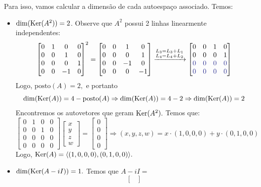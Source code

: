 \documentclass[11pt,a4paper]{article}
\begin{document}
{Para isso, vamos calcular a dimensão de cada autoespaço associado. Temos:
\begin{itemize}
\item $\dim(\operatorname{Ker}(A^2)) =2$. Observe que $A^2$ possui 2 linhas linearmente independentes:
\[ \begin{bmatrix}
0 & 1 & 0& 0\\
0 &0 &1 & 0 \\
0 &0 &0& 1 \\
0 & 0 & -1&0
\end{bmatrix}^2 = \begin{bmatrix}
0 & 0 & 1& 0\\
0 &0 &0 & 1 \\
0 &0 &-1& 0 \\
0 & 0 & 0&-1
\end{bmatrix}  \xrightarrow[]{\substack{L_3 = L_3 +L_1 \\L_4 = L_4 +L_2}}  \begin{bmatrix}
0 & 0 & 1& 0\\
0 &0 &0 & 1 \\
\textcolor{Blue}{0} & \textcolor{Blue}{0} & \textcolor{Blue}{0}&\textcolor{Blue}{0}\\
\textcolor{Blue}{0} & \textcolor{Blue}{0} & \textcolor{Blue}{0}&\textcolor{Blue}{0}
\end{bmatrix} 
\]
Logo, $\mbox{posto}(A) = 2,$ e portanto 
\[\dim(\operatorname{Ker}(A)) = 4 - \mbox{posto}(A)  \Rightarrow \dim(\operatorname{Ker}(A)) = 4 - 2 \Rightarrow \dim(\operatorname{Ker}(A)) = 2
\]
Encontremos os autovetores que geram $\operatorname{Ker}(A^2).$ Temos que:
\[
\begin{bmatrix}
0 & 1 & 0& 0\\
0 &0 &1 & 0 \\
0 &0 &0& 0 \\
0 & 0 & 0 & 0
\end{bmatrix} \begin{bmatrix} x \\ y \\ z \\w  \end{bmatrix} = \begin{bmatrix} 0 \\ 0 \\ 0 \\0  \end{bmatrix} \Rightarrow (x,y,z,w) = x \cdot (1,0,0,0) + y \cdot (0,1,0,0)
\]
Logo, $\operatorname{Ker}(A) = \langle (1,0,0,0), (0,1,0,0) \rangle.$
\item $\dim(\operatorname{Ker}(A - iI)) = 1.$ Temos que $A - iI = $
\[
\begin{bmatrix}

\end{bmatrix}\]
\end{itemize}}
\end{document}
